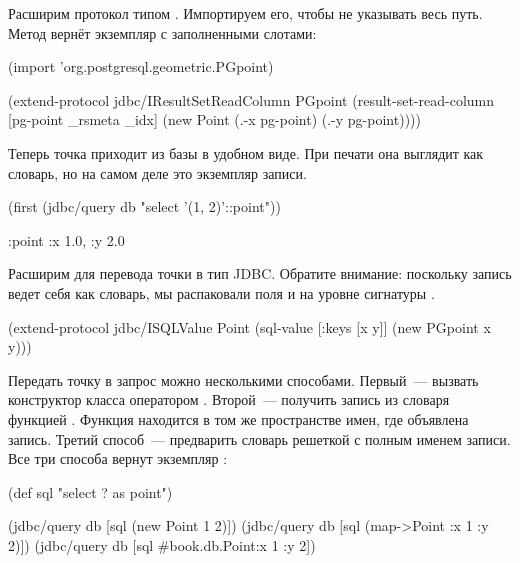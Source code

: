 Расширим протокол  типом . Импортируем его, чтобы не указывать весь путь. Метод  вернёт экземпляр  с заполненными слотами:

\begin{english}
  \begin{clojure}
(import 'org.postgresql.geometric.PGpoint)

(extend-protocol jdbc/IResultSetReadColumn
  PGpoint
  (result-set-read-column [pg-point _rsmeta _idx]
    (new Point (.-x pg-point)
               (.-y pg-point))))
  \end{clojure}
\end{english}

Теперь точка приходит из базы в удобном виде. При печати она выглядит как словарь, но на самом деле это экземпляр записи.


\begin{english}
  \begin{clojure}
(first
  (jdbc/query db "select '(1, 2)'::point"))

{:point {:x 1.0, :y 2.0}}
  \end{clojure}
\end{english}

Расширим  для перевода точки в тип JDBC. Обратите внимание: поскольку запись ведет себя как словарь, мы распаковали поля  и  на уровне сигнатуры .

\begin{english}
  \begin{clojure/lines}
(extend-protocol jdbc/ISQLValue
  Point
  (sql-value [{:keys [x y]}]
    (new PGpoint x y)))
  \end{clojure/lines}
\end{english}

Передать точку в запрос можно несколькими способами. Первый~--- вызвать конструктор класса оператором . Второй~--- получить запись из словаря функцией . Функция находится в том же пространстве имен, где объявлена запись. Третий способ~--- предварить словарь решеткой с полным именем записи. Все три способа вернут экземпляр :

\begin{english}
  \begin{clojure}
(def sql "select ? as point")

(jdbc/query db [sql (new Point 1 2)])
(jdbc/query db [sql (map->Point {:x 1 :y 2})])
(jdbc/query db [sql #book.db.Point{:x 1 :y 2}])
  \end{clojure}
\end{english}

